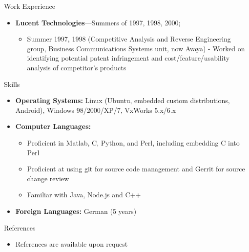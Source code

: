 \documentclass[10pt,oneside]{article}
\newenvironment{ressection}[1]{
	\vspace{4pt}
	{\Large#1}
	\begin{itemize}
	\vspace{3pt}
}{
	\end{itemize}
}
\newcommand{\resitem}[1]{
	\vspace{-4pt}
	\item \begin{flushleft} #1 \end{flushleft}
}
\newcommand{\ressubitem}[1]{
	\vspace{-1pt}
	\item \begin{flushleft} #1 \end{flushleft}
}
\newcommand{\resbigitem}[3]{
	\vspace{-5pt}
	\item
	\textbf{#1}---#2; \quad \textit{#3}
}
\newenvironment{ressubsec}[3]{
	\resbigitem{#1}{#2}{#3}
	\vspace{-2pt}
	\begin{itemize}
}{
	\end{itemize}
}
\newenvironment{reslist}[1]{
	\resitem{\textbf{#1}}
	\vspace{-5pt}
	\begin{itemize}
}{
	\end{itemize}
}
\newenvironment{ressection}[1]{
	\vspace{4pt}
	{\fontfamily{phv}\selectfont\Large#1}
	\begin{itemize}
	\vspace{3pt}
}{
	\end{itemize}
}
\newcommand{\resitem}[1]{
	\vspace{-4pt}
	\item \begin{flushleft} #1 \end{flushleft}
}
\newcommand{\ressubitem}[1]{
	\vspace{-1pt}
	\item \begin{flushleft} #1 \end{flushleft}
}
\newcommand{\resbigitem}[2]{
	\vspace{-5pt}
	\item
	\textbf{#1}---\textit{#2}
}
\newenvironment{ressubsec}[2]{
	\resbigitem{#1}{#2}
	\vspace{-2pt}
	\begin{itemize}
}{
	\end{itemize}
}
\newenvironment{reslist}[1]{
	\resitem{\textbf{#1}}
	\vspace{-5pt}
	\begin{itemize}
}{
	\end{itemize}
}
\begin{document}
\begin{ressection}{Work Experience}
	\begin{ressubsec}{Lucent Technologies}{Summers of 1997, 1998, 2000}
	  \ressubitem{2000 (Silicon Processing Research Group) Independently created a CGI front-end to a simulation tool and software to process an ion implantation simulator output. Independently initiated a port of simulation tools from older Unix variants to Linux so that extensive simulation could be done on a low end machine to meet deadlines.}
          \ressubitem{Summer 1997, 1998 (Competitive Analysis and Reverse Engineering group, Business Communications Systems unit, now Avaya) - Worked on identifying potential patent infringement and cost/feature/usability analysis of competitor's products}
	\end{ressubsec}

\end{ressection}

\begin{ressection}{Skills}

	\resitem{\textbf{Operating Systems:} Linux (Ubuntu, embedded custom distributions, Android), Windows 98/2000/XP/7, VxWorks 5.x/6.x}

	\begin{reslist}{Computer Languages:}
	  \ressubitem{Proficient in Matlab, C, Python, and Perl, including embedding C into Perl}
          \ressubitem{Proficient at using git for source code management and Gerrit for source change review}
	  \ressubitem{Familiar with Java, Node.js and C++}
	\end{reslist}

	\resitem{\textbf{Foreign Languages:} German (5 years)}

\end{ressection}

\begin{ressection}{References}
  \resitem{References are available upon request}
\end{ressection}
\end{document}
